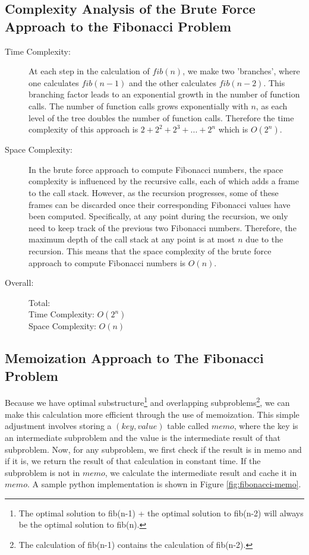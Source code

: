 \subsection{Complexity Analysis of the Brute Force Approach to the Fibonacci Problem}

\begin{description}
    \item[Time Complexity:]
    At each step in the calculation of $fib(n)$, we make two 'branches', where one calculates $fib(n-1)$ and the other calculates $fib(n-2)$.
    This branching factor leads to an exponential growth in the number of function calls.
    The number of function calls grows exponentially with $n$, as each level of the tree doubles the number of function calls.
    Therefore the time complexity of this approach is $2 + 2^2 + 2^3 + ... + 2^n$ which is $O(2^n)$.
        
    \item[Space Complexity:] 
        In the brute force approach to compute Fibonacci numbers, the space complexity is influenced by the recursive calls, each of which adds a frame to the call stack. However, as the recursion progresses, some of these frames can be discarded once their corresponding Fibonacci values have been computed.
        Specifically, at any point during the recursion, we only need to keep track of the previous two Fibonacci numbers. Therefore, the maximum depth of the call stack at any point is at most $n$ due to the recursion.
        This means that the space complexity of the brute force approach to compute Fibonacci numbers is $O(n)$.
        
        
    \item[Overall:] Total:\\
        Time Complexity: $O(2^n)$\\
        Space Complexity: $O(n)$
        
\end{description}

\subsection{Memoization Approach to The Fibonacci Problem}
Because we have optimal substructure\footnote{The optimal solution to fib(n-1) + the optimal solution to fib(n-2) will always be the optimal solution to fib(n).}
and overlapping subproblems\footnote{The calculation of fib(n-1) contains the calculation of fib(n-2).}, we can make this calculation more efficient through the use of memoization.
This simple adjustment involves storing a $(key, value)$ table called $memo$, where the key is an intermediate subproblem and the value is the intermediate result of that subproblem.
Now, for any subproblem, we first check if the result is in memo and if it is, we return the result of that calculation in constant time.
If the subproblem is not in $memo$, we calculate the intermediate result and cache it in $memo$.
A sample python implementation is shown in Figure \ref{fig:fibonacci-memo}.


